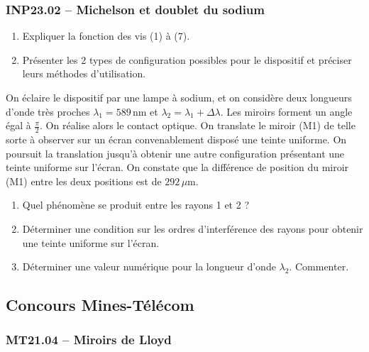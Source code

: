 \subsubsection*{INP23.02 -- Michelson et doublet du sodium  \lesdeux}

\begin{center}
\end{center}

\begin{enumerate}
\item Expliquer la fonction des vis (1) à (7).
\item Présenter les 2 types de configuration possibles pour le dispositif et préciser leurs méthodes d'utilisation.
\end{enumerate}
On éclaire le dispositif par une lampe à sodium, et on considère deux longueurs d'onde très proches $\lambda_{1} = 589\,\text{nm}$ et $\lambda_{2} = \lambda_{1} + \Delta\lambda$. Les miroirs forment un angle égal à $\frac{\pi}{2}$. On réalise alors le contact optique. On translate le miroir (M1) de telle sorte à observer sur un écran convenablement disposé une teinte uniforme. On poursuit la translation jusqu'à obtenir une autre configuration présentant une teinte uniforme sur l'écran. On constate que la différence de position du miroir (M1) entre les deux positions est de $292\,\mu\text{m}$.
\begin{enumerate}[resume]
\item Quel phénomène se produit entre les rayons 1 et 2 ?
\item Déterminer une condition sur les ordres d'interférence des rayons pour obtenir une teinte uniforme sur l'écran.
\item Déterminer une valeur numérique pour la longueur d'onde $\lambda_{2}$. Commenter.
\end{enumerate}

\newpage
\subsection*{Concours Mines-Télécom}
\subsubsection*{MT21.04 -- Miroirs de Lloyd }

